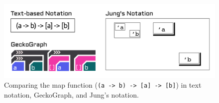 \begin{figure}[hbt]
  \includegraphics[width=\linewidth]{figures/Jung}
  \caption[Comparing GeckoGraph with Jung's notation]{
        \label{fig:jung}
        Comparing the map function (\texttt{(a -> b) -> [a] -> [b]}) in text notation, GeckoGraph, and Jung's notation.
  }
\end{figure}



